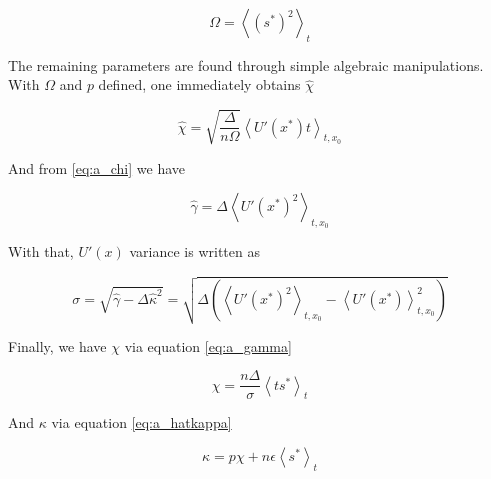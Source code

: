 \begin{equation}
  \label{eq:a_57}
\Omega = \left\langle (s^*)^2 \right\rangle_t
\end{equation}

The remaining parameters are found through simple algebraic manipulations. With $\Omega$ and $p$ defined, one immediately obtains $\hat{\chi}$

\begin{equation}
  \label{eq:a_58}
\hat{\chi} = \sqrt{\frac{\Delta}{n\Omega}} \left \langle U'(x^*) t
\right \rangle_{t,x_0}
\end{equation}

And from \eqref{eq:a_chi} we have

 \begin{equation}
  \label{eq:a_59}
\hat{\gamma} =
\Delta \left \langle U'(x^*)^2 \right \rangle_{t,x_0}
\end{equation}

With that, $U'(x)$ variance is written as

\begin{equation}
  \label{eq:a_60}
\sigma = \sqrt{\hat{\gamma} - \Delta \hat{\kappa}^2} = \sqrt{\Delta
    \left(\left \langle U'(x^*)^2 \right \rangle_{t,x_0} - \left
        \langle U'(x^*) \right \rangle_{t,x_0}^2 \right)}
\end{equation}

Finally, we have $\chi$ via equation \eqref{eq:a_gamma}

  \begin{equation}
    \label{eq:a_61}
    \chi = \frac{n\Delta}{\sigma} \left \langle t s^* \right \rangle_t
  \end{equation}

And $\kappa$ via equation \eqref{eq:a_hatkappa}

\begin{equation}
  \label{eq:a_62}
  \kappa = p \chi + n\epsilon \left \langle s^* \right \rangle_t
\end{equation}
